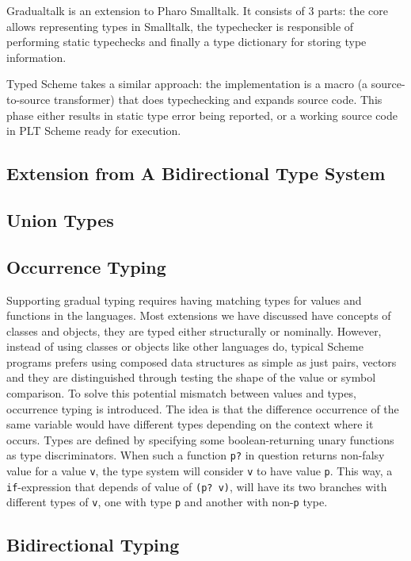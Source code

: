 Gradualtalk is an extension to Pharo Smalltalk. It consists of 3 parts:
the core allows representing types in Smalltalk, the typechecker
is responsible of performing static typechecks and finally
a type dictionary for storing type information.

Typed Scheme takes a similar approach: the implementation is a macro
(a source-to-source transformer) that does typechecking and expands source code.
This phase either results in static type error being reported,
or a working source code in PLT Scheme ready for execution.

\subsection{Extension from A Bidirectional Type System}

\subsection{Union Types}

\subsection{Occurrence Typing}

Supporting gradual typing requires having matching types for values and functions in the languages.
Most extensions we have discussed have concepts of classes and objects, they are typed either
structurally or nominally.
However, instead of using classes or objects like other languages do,
typical Scheme programs prefers using composed data structures as simple as just pairs, vectors
and they are distinguished through testing the shape of the value or
symbol comparison.
To solve this potential mismatch between values and types, occurrence typing is introduced.
The idea is that the difference occurrence of the same variable would have different types
depending on the context where it occurs.
Types are defined by specifying some boolean-returning unary functions as type discriminators.
When such a function \texttt{p?} in question returns non-falsy value for a value \texttt{v},
the type system will consider \texttt{v} to have value \texttt{p}.
This way, a \texttt{if}-expression that depends of value of \texttt{(p? v)},
will have its two branches with different types of \texttt{v}, one with type \texttt{p}
and another with non-\texttt{p} type.

\subsection{Bidirectional Typing}

